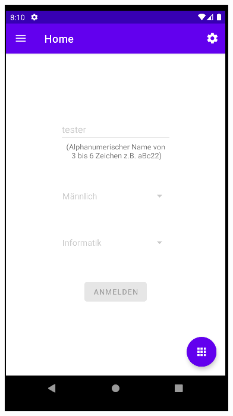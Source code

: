 \documentclass{article}
\begin{document}
\begin{center}
    \includegraphics[scale=0.45]{reg_fail.png}
\end{center}



\newpage
\end{document}

